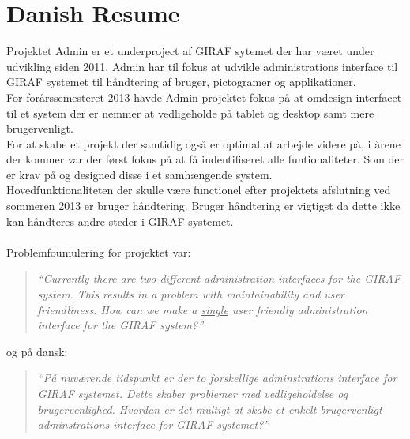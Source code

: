 \chapter*{Danish Resume}
Projektet Admin er et underproject af GIRAF sytemet der har været under udvikling siden 2011. Admin har til fokus at udvikle administrations interface til GIRAF systemet til håndtering af bruger, pictogramer og applikationer.\\
For forårssemesteret 2013 havde Admin projektet fokus på at omdesign interfacet til et system der er nemmer at vedligeholde på tablet og desktop samt mere brugervenligt.\\
For at skabe et projekt der samtidig også er optimal at arbejde videre på, i årene der kommer var der først fokus på at få indentifiseret alle funtionaliteter. Som der er krav på og designed disse i et samhængende system.\\
Hovedfunktionaliteten der skulle være functionel efter projektets afslutning ved sommeren 2013 er bruger håndtering.   
Bruger håndtering er vigtigst da dette ikke kan håndteres andre steder i GIRAF systemet.\\
\\
Problemfoumulering for projektet var: 
\begin{verse}
\textit{``Currently there are two different administration interfaces for the GIRAF system.
This results in a problem with maintainability and user friendliness.
How can we make a \underline{single} user friendly administration interface for the GIRAF system?''}
\end{verse}

og på dansk: 
\begin{verse}
\textit{``På nuværende tidspunkt er der to forskellige adminstrations interface for GIRAF systemet.
Dette skaber problemer med vedligeholdelse og brugervenlighed. 
Hvordan er det multigt at skabe et \underline{enkelt} brugervenligt adminstrations interface for GIRAF systemet?''}
\end{verse}


